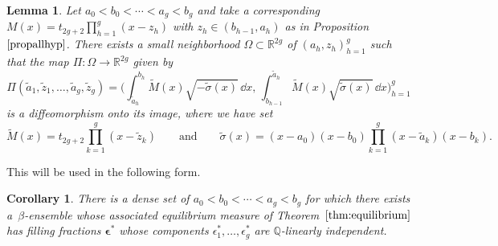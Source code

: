 \documentclass[pdftex]{sigma}
\numberwithin{equation}{section}
\newtheorem{Corollary}[Theorem]{Corollary}
\newtheorem{Lemma}[Theorem]{Lemma}
\begin{document}
\begin{Lemma}
 \label{periodma}Let $a_0 < b_0 < \cdots < a_g < b_g$ and take a
 corresponding $M(x) = t_{2g + 2} \prod_{h=1}^{g}(x - z_{h})$ with $z_h \in (b_{h - 1},a_h)$ as in
 Proposition~$\ref{propallhyp}$. There exists a small neighborhood
 $\Omega \subset \mathbb{R}^{2g}$ of $(a_h,z_h)_{h = 1}^{g}$ such
 that the map $\Pi \colon \Omega \rightarrow \mathbb{R}^{2g}$ given by
\[
\Pi(\tilde{a}_1,\tilde{z}_1,\ldots,\tilde{a}_g,\tilde{z}_g) = \biggl(\int_{\tilde{a}_h}^{b_h} \tilde{M}(x)\sqrt{-\tilde{\sigma}(x)}\,\dd x,\,\int_{b_{h - 1}}^{\tilde{a}_h} \tilde{M}(x) \sqrt{\tilde{\sigma}(x)}\, \dd x\biggr)_{h = 1}^{g}
\]
is a diffeomorphism onto its image, where we have set
\[
\tilde{M}(x) = t_{2g + 2} \prod_{k=1}^{g}(x - \tilde{z}_k) \qquad \text{and} \qquad \tilde{\sigma}(x) = (x - a_0)(x - b_0)\prod_{k = 1}^{g} (x - \tilde{a}_k)(x -b_k).
\]
\end{Lemma}
This will be used in the following form.
\begin{Corollary}
\label{codense}There is a dense set of $a_0 < b_0 < \cdots < a_g < b_g$ for which there exists \mbox{a~$\beta$-ensemble} whose associated equilibrium measure of Theorem~$\ref{thm:equilibrium}$ has filling fractions $\boldsymbol{\epsilon}^*$ whose components $\epsilon_{1}^*,\ldots,\epsilon_g^*$ are $\mathbb{Q}$-linearly independent.
\end{Corollary}
\end{document}
